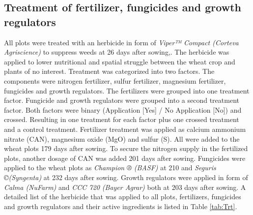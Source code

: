 \documentclass[twoside,12pt,final]{ucthesis-CA2012}
\begin{document}
\begin{ucmainmatter}
\hypertarget{treatment-of-fertilizer-fungicides-and-growth-regulators}{%
\subsection{Treatment of fertilizer, fungicides and growth regulators}\label{treatment-of-fertilizer-fungicides-and-growth-regulators}}

All plots were treated with an herbicide in form of \emph{Viper™ Compact (Corteva Agriscience)} to suppress weeds at 26 days after sowing,. The herbicide was applied to lower nutritional and spatial struggle between the wheat crop and plants of no interest.
Treatment was categorized into two factors. The components were nitrogen fertilizer, sulfur fertilizer, magnesium fertilizer, fungicides and growth regulators. The fertilizers were grouped into one treatment factor. Fungicide and growth regulators were grouped into a second treatment factor. Both factors were binary (Application {[}Yes{]} / No Application {[}No{]}) and crossed. Resulting in one treatment for each factor plus one crossed treatment and a control treatment. Fertilizer treatment was applied as calcium ammonium nitrate (CAN), magnesium oxide (MgO) and sulfur (S). All were added to the wheat plots 179 days after sowing. To secure the nitrogen supply in the fertilized plots, another dosage of CAN was added 201 days after sowing. Fungicides were applied to the wheat plots as \emph{Champion ® (BASF)} at 210 and \emph{Seguris \copyright (Syngenta)} at 232 days after sowing. Growth regulators were applied in form of \emph{Calma (NuFarm)} and \emph{CCC 720 (Bayer Agrar)} both at 203 days after sowing. A detailed list of the herbicide that was applied to all plots, fertilizers, fungicides and growth regulators and their active ingredients is listed in Table \ref{tab:Trt}.
\begin{table}


\end{table}
\end{ucmainmatter}
\end{document}
